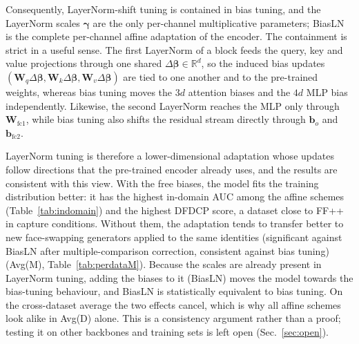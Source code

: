 \documentclass[fonts]{icst}
\begin{document}
Consequently, LayerNorm-shift tuning is contained in bias tuning, and the LayerNorm scales $\boldsymbol{\gamma}$ are the only per-channel multiplicative parameters; BiasLN is the complete per-channel affine adaptation of the encoder. The containment is strict in a useful sense. The first LayerNorm of a block feeds the query, key and value projections through one shared $\Delta\boldsymbol{\beta}\in\mathbb{R}^{d}$, so the induced bias updates $(\mathbf{W}_q\Delta\boldsymbol{\beta},\mathbf{W}_k\Delta\boldsymbol{\beta},\mathbf{W}_v\Delta\boldsymbol{\beta})$ are tied to one another and to the pre-trained weights, whereas bias tuning moves the $3d$ attention biases and the $4d$ MLP bias independently. Likewise, the second LayerNorm reaches the MLP only through $\mathbf{W}_{\mathrm{fc1}}$, while bias tuning also shifts the residual stream directly through $\mathbf{b}_o$ and $\mathbf{b}_{\mathrm{fc2}}$.

LayerNorm tuning is therefore a lower-dimensional adaptation whose updates follow directions that the pre-trained encoder already uses, and the results are consistent with this view. With the free biases, the model fits the training distribution better: it has the highest in-domain AUC among the affine schemes (Table~\ref{tab:indomain}) and the highest DFDCP score, a dataset close to FF++ in capture conditions. Without them, the adaptation tends to transfer better to new face-swapping generators applied to the same identities (significant against BiasLN after multiple-comparison correction, consistent against bias tuning) (Avg(M), Table~\ref{tab:perdataM}). Because the scales are already present in LayerNorm tuning, adding the biases to it (BiasLN) moves the model towards the bias-tuning behaviour, and BiasLN is statistically equivalent to bias tuning. On the cross-dataset average the two effects cancel, which is why all affine schemes look alike in Avg(D) alone. This is a consistency argument rather than a proof; testing it on other backbones and training sets is left open (Sec.~\ref{sec:open}).

\end{document}
